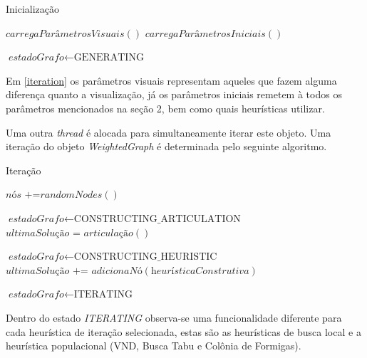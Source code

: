 \documentclass[conference,compsoc]{IEEEtran}
\begin{document}
\begin{algorithm}
\caption{Inicialização}\label{iteration}
\begin{algorithmic}[1]
  $carregaParâmetrosVisuais()$
  $carregaParâmetrosIniciais()$
  
        \State $\textit{estadoGrafo} \gets \text{GENERATING}$
    \EndIf
  
\EndProcedure
\end{algorithmic}
\end{algorithm}

Em \ref{iteration} os parâmetros visuais representam aqueles que fazem alguma diferença quanto a visualização, já os parâmetros iniciais remetem à todos os parâmetros mencionados na seção 2, bem como quais heurísticas utilizar.

Uma outra \textit{thread} é alocada para simultaneamente iterar este objeto. Uma iteração do objeto \textit{WeightedGraph} é determinada pelo seguinte algoritmo.

\begin{algorithm}
\caption{Iteração}\label{iteration}
\begin{algorithmic}[1]
    
    \State $\textit{nós +=} \textit{randomNodes}()$
    
        \State $\textit{estadoGrafo} \gets \text{CONSTRUCTING\_ARTICULATION}$
    \EndIf
    \EndCase
      \State $\textit{ultimaSolução = } \textit{articulação}()$
      
      \State $\textit{estadoGrafo} \gets \text{CONSTRUCTING\_HEURISTIC}$
    \EndCase
      \State $\textit{ultimaSolução += adicionaNó}(\textit{heurísticaConstrutiva})$
      
    
        \State $\textit{estadoGrafo} \gets \text{ITERATING}$
    \EndIf
    \EndCase
        \EndSwitch
    \EndCase
  \EndSwitch
\EndProcedure
\end{algorithmic}
\end{algorithm}

Dentro do estado \textit{ITERATING} observa-se uma funcionalidade diferente para cada heurística de iteração selecionada, estas são as heurísticas de busca local e a heurística populacional (VND, Busca Tabu e Colônia de Formigas).
\end{document}
